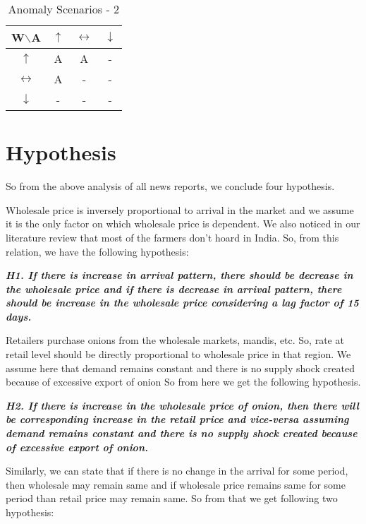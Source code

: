 \begin{table}
\centering
\begin{tabular}{ | c | c | c | c |}  
  \hline
  \textbf{W$\backslash$A} & \textbf{$\uparrow$} & \textbf{$\leftrightarrow$}  & \textbf{$\downarrow$} \\ \hline
  \textbf{$\uparrow$} & {\color{red}A} & {\color{red}A} & - \\ \hline
  \textbf{$\leftrightarrow$} & {\color{red}A} & - & - \\ \hline
  \textbf{$\downarrow$} & - & - & - \\ \hline
\end{tabular}
\caption{Anomaly Scenarios - 2}
\label{table:2}
\end{table}

\section{Hypothesis}

So from the above analysis of all news reports, we conclude four hypothesis. 

Wholesale price is inversely proportional to arrival in the market and we assume it is the only factor on which wholesale price is dependent. We also noticed in our literature review that most of the farmers don’t hoard in India. So, from this relation, we have the following hypothesis:

\textbf{\textit{H1. If there is increase in arrival pattern, there should be decrease in the wholesale price and if there is decrease in arrival pattern, there should be increase in the wholesale price considering a lag factor of 15 days.}}

Retailers purchase onions from the wholesale markets, mandis, etc. So, rate at retail level should be directly proportional to wholesale price in that region. We assume here that demand remains constant and there is no supply shock created because of excessive export of onion So from here we get the following hypothesis.

\textbf{\textit{H2. If there is increase in the wholesale price of onion, then there will be corresponding increase in the retail price and vice-versa assuming demand remains constant and there is no supply shock created because of excessive export of onion.}}

Similarly, we can state that if there is no change in the arrival for some period, then wholesale may remain same and if wholesale price remains same for some period than retail price may remain same. So from that we get following two hypothesis:


